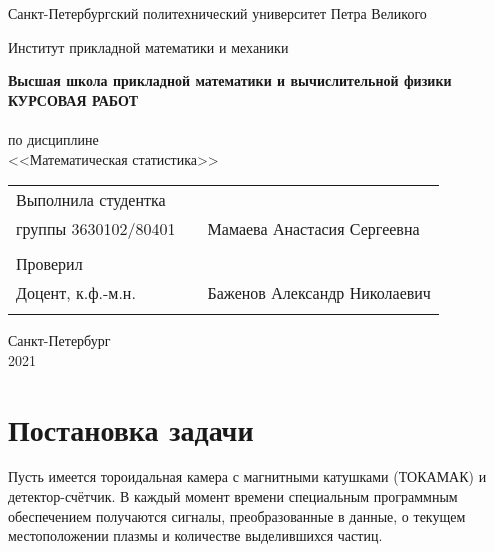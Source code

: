 \documentclass{article}
\begin{document}
\begin{titlepage}
  \begin{center}
    \large
    Санкт-Петербургский политехнический университет Петра Великого
    
    Институт прикладной математики и механики
    
    \textbf{Высшая школа прикладной математики и вычислительной физики}
    \vfill
    \textsc{\textbf{\Large{КУРСОВАЯ РАБОТ}}}\\[5mm]
    \\ по дисциплине
    \\ <<Математическая статистика>>\\
\end{center}

\vfill

\begin{tabular}{l p{} l}
Выполнила студентка \\группы 3630102/80401 && Мамаева Анастасия Сергеевна \\
\\
Проверил\\Доцент, к.ф.-м.н.& \hspace{0pt} &   Баженов Александр Николаевич \\\\
\end{tabular}

\hfill \break
\hfill \break
\begin{center} Санкт-Петербург \\2021 \end{center}
\thispagestyle{empty}
\end{titlepage}
\newpage
\newpage
\begin{center}
    \setcounter{page}{2}
    \tableofcontents
\end{center}
\newpage
\begin{center}
    \setcounter{page}{3}
    \listoffigures
\end{center}

\newpage

\section{Постановка задачи}
\noindent Пусть имеется тороидальная камера с магнитными катушками (ТОКАМАК) и детектор-счётчик. В каждый момент времени специальным программным обеспечением получаются сигналы, преобразованные в данные, о текущем местоположении плазмы и количестве выделившихся частиц.
\end{document}
